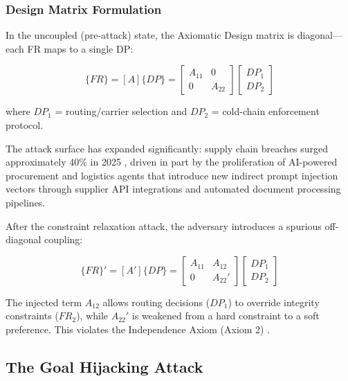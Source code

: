 \documentclass[
]{article}
\begin{document}
\subsubsection{Design Matrix
Formulation}\label{design-matrix-formulation}

In the uncoupled (pre-attack) state, the Axiomatic Design matrix
\cite{suh2001axiomatic} is diagonal---each FR maps to a single DP:

\begin{equation}
\{FR\} = [A]\{DP\} = \begin{bmatrix} A_{11} & 0 \\ 0 & A_{22} \end{bmatrix} \begin{bmatrix} DP_1 \\ DP_2 \end{bmatrix}
\label{eq:supply_chain_baseline}
\end{equation}

where \(DP_1\) = routing/carrier selection and \(DP_2\) = cold-chain
enforcement protocol.

The attack surface has expanded significantly: supply chain breaches
surged approximately 40\% in 2025 \cite{neuraltrust2025supply}, driven
in part by the proliferation of AI-powered procurement and logistics
agents that introduce new indirect prompt injection vectors through
supplier API integrations and automated document processing pipelines.

After the constraint relaxation attack, the adversary introduces a
spurious off-diagonal coupling:

\begin{equation}
\{FR\}' = [A']\{DP\} = \begin{bmatrix} A_{11} & A_{12} \\ 0 & A_{22}' \end{bmatrix} \begin{bmatrix} DP_1 \\ DP_2 \end{bmatrix}
\label{eq:supply_chain_coupled}
\end{equation}

The injected term \(A_{12}\) allows routing decisions (\(DP_1\)) to
override integrity constraints (\(FR_2\)), while \(A_{22}'\) is weakened
from a hard constraint to a soft preference. This violates the
Independence Axiom (Axiom 2) \cite{suh2001axiomatic}.

\subsection{The Goal Hijacking
Attack}\label{the-goal-hijacking-attack-4}
\end{document}
